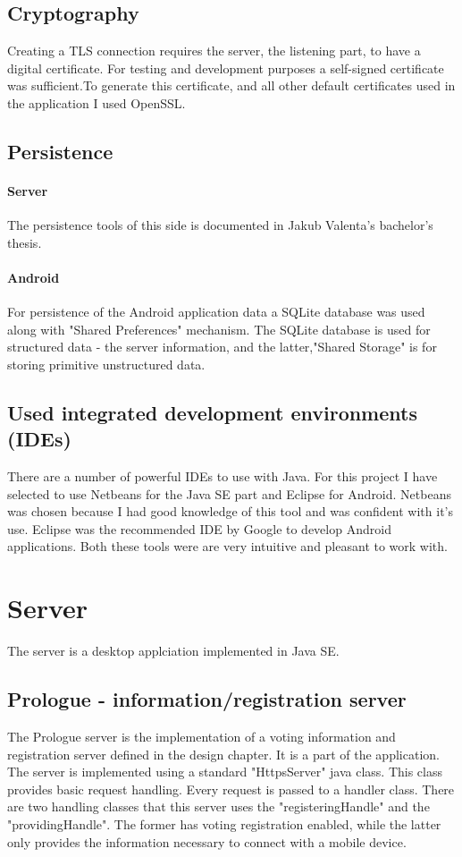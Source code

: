 \documentclass[11pt,twoside,a4paper]{book}
\begin{document}
\subsection{Cryptography}
Creating a TLS\cite{tls} connection requires the server, the listening part, to have a digital certificate. For testing and development purposes a self-signed certificate was sufficient.To generate this certificate, and all other default certificates used in the application I used OpenSSL\cite{openssl}.

\subsection{Persistence}
\paragraph{Server} The persistence tools of this side is documented in Jakub Valenta's bachelor's thesis\cite{bakalarkaJV}.
\paragraph{Android}
For persistence of the Android application data a SQLite\cite{sqlite} database was used along with "Shared Preferences"\cite{storage} mechanism. The SQLite database is used for structured data - the server information, and the latter,"Shared Storage" is for storing primitive unstructured data.

\subsection{Used integrated development environments (IDEs)}
There are a number of powerful IDEs to use with Java. For this project I have selected to use Netbeans for the Java SE part and Eclipse for Android. Netbeans was chosen because I had good knowledge of this tool and was confident with it's use. Eclipse was the recommended IDE by Google to develop Android applications. Both these tools were are very intuitive and pleasant to work with. 

\section{Server}
The server is a desktop applciation implemented in Java SE.
\subsection{Prologue - information/registration server}
The Prologue server is the implementation of a voting information and registration server defined in the design chapter. It is a part of the application. The server is implemented using a standard "HttpsServer" java class. This class provides basic request handling. Every request is passed to a handler class. There are two handling classes that this server uses the "registeringHandle" and the "providingHandle". The former has voting registration enabled, while the latter only provides the information necessary to connect with a mobile device.
\end{document}
